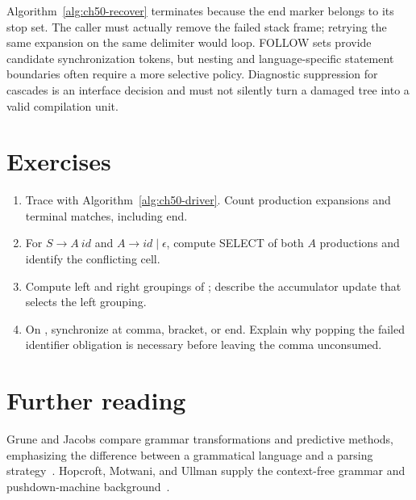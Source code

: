 Algorithm~\ref{alg:ch50-recover} terminates because the end marker belongs to its stop set.
The caller must actually remove the failed stack frame; retrying the same expansion on the same delimiter would loop.
FOLLOW sets provide candidate synchronization tokens, but nesting and language-specific statement boundaries often require a more selective policy.
Diagnostic suppression for cascades is an interface decision and must not silently turn a damaged tree into a valid compilation unit.

\section{Exercises}
\label{sec:ch50-exercises}
\begin{enumerate}
\item\label{ex:ch50-three} Trace \code{[id,id,id]} with Algorithm~\ref{alg:ch50-driver}. Count production expansions and terminal matches, including end.
\item\label{ex:ch50-conflict} For $S\to A\ \mathit{id}$ and $A\to\mathit{id}\mid\epsilon$, compute SELECT of both $A$ productions and identify the conflicting cell.
\item\label{ex:ch50-fold} Compute left and right groupings of ; describe the accumulator update that selects the left grouping.
\item\label{ex:ch50-recovery} On \code{[id,,id]}, synchronize at comma, bracket, or end. Explain why popping the failed identifier obligation is necessary before leaving the comma unconsumed.
\end{enumerate}

\section{Further reading}
\label{sec:ch50-reading}
Grune and Jacobs compare grammar transformations and predictive methods, emphasizing the difference between a grammatical language and a parsing strategy~\cite{grune-2008-parsing}.
Hopcroft, Motwani, and Ullman supply the context-free grammar and pushdown-machine background~\cite{hopcroft-2007-automata}.
